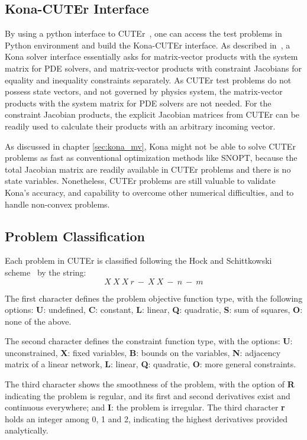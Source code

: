 \subsection{Kona-CUTEr Interface}
By using a python interface to CUTEr~\cite{cuter_python}, one can access the test problems in Python environment and build the Kona-CUTEr interface. As described in~\cite{dener:scitech2016}, a Kona solver interface essentially asks for matrix-vector products with the system matrix for PDE solvers, and matrix-vector products with constraint Jacobians for equality and inequality constraints separately. As CUTEr test problems do not possess state vectors, and not governed by physics system, the matrix-vector products with the system matrix for PDE solvers are not needed. For the constraint Jacobian products, the explicit Jacobian matrices from CUTEr can be readily used to calculate their products with an arbitrary incoming vector. 

As discussed in chapter \ref{sec:kona_mv}, Kona might not be able to solve CUTEr problems as fast as conventional optimization methods like SNOPT, because the total Jacobian matrix are readily available in CUTEr problems and there is no state variables.  Nonetheless, CUTEr problems are still valuable to validate Kona's accuracy, and capability to overcome other numerical difficulties, and to handle non-convex problems. 

\subsection{Problem Classification}
Each problem in CUTEr is classified following the Hock and Schittkowski scheme~\cite{cuterScheme} by the string: 
\begin{equation*}
X \ X \ X \ r \ - \ X \ X \ - \ n \ - \ m
\end{equation*}

The first character defines the problem objective function type, with the following options: 
\textbf{U}: undefined, \textbf{C}: constant, \textbf{L}: linear, \textbf{Q}: quadratic, \textbf{S}: sum of squares, \textbf{O}: none of the above. 

The second character defines the constraint function type, with the options: 
\textbf{U}: unconstrained, \textbf{X}: fixed variables, \textbf{B}: bounds on the variables, \textbf{N}: adjacency matrix of a linear network, \textbf{L}: linear, \textbf{Q}: quadratic, \textbf{O}: more general constraints. 

The third character shows the smoothness of the problem, with the option of \textbf{R} indicating the problem is regular, and its first and second derivatives exist and continuous everywhere; and \textbf{I}: the problem is irregular. The third character \textbf{r} holds an integer among 0, 1 and 2, indicating the highest derivatives provided analytically.

